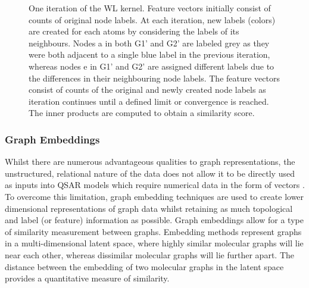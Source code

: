 \documentclass[
  super,
  preprint,
  3p]{elsarticle}
\begin{document}
\begin{figure}


\caption{\label{fig-wl}One iteration of the WL kernel. Feature vectors
initially consist of counts of original node labels. At each iteration,
new labels (colors) are created for each atoms by considering the labels
of its neighbours. Nodes a in both G1' and G2' are labeled grey as they
were both adjacent to a single blue label in the previous iteration,
whereas nodes e in G1' and G2' are assigned different labels due to the
differences in their neighbouring node labels. The feature vectors
consist of counts of the original and newly created node labels as
iteration continues until a defined limit or convergence is reached. The
inner products are computed to obtain a similarity score.}

\end{figure}%

\subsubsection{Graph Embeddings}\label{sec-graphembed}

Whilst there are numerous advantageous qualities to graph
representations, the unstructured, relational nature of the data does
not allow it to be directly used as inputs into QSAR models which
require numerical data in the form of vectors
\citep{cai_comprehensive_2018}. To overcome this limitation, graph
embedding techniques are used to create lower dimensional
representations of graph data whilst retaining as much topological and
label (or feature) information as possible. Graph embeddings allow for a
type of similarity measurement between graphs. Embedding methods
represent graphs in a multi-dimensional latent space, where highly
similar molecular graphs will lie near each other, whereas dissimilar
molecular graphs will lie further apart. The distance between the
embedding of two molecular graphs in the latent space provides a
quantitative measure of similarity.
\end{document}
